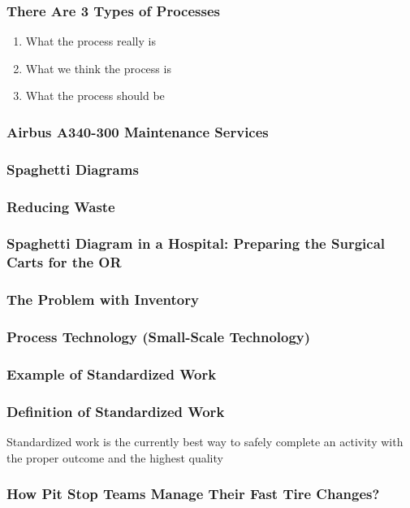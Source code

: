 \subsubsection{ There Are 3 Types of Processes}
\begin{enumerate}
	\item What the process really is
	\item What we think the process is
	\item What the process should be
\end{enumerate}
\subsubsection{Airbus A340-300 Maintenance Services}
\subsubsection{Spaghetti Diagrams}
\subsubsection{Reducing Waste}
\subsubsection{Spaghetti Diagram in a Hospital:	Preparing the Surgical Carts for the OR}
\subsubsection{ The Problem with Inventory}
\subsubsection{ Process Technology (Small-Scale Technology)}
\subsubsection{ Example of Standardized Work}
\subsubsection{Definition of Standardized Work}
Standardized work is the currently best way to safely complete an activity with the proper outcome and the highest quality
\subsubsection{How Pit Stop Teams Manage Their Fast	Tire Changes?}
